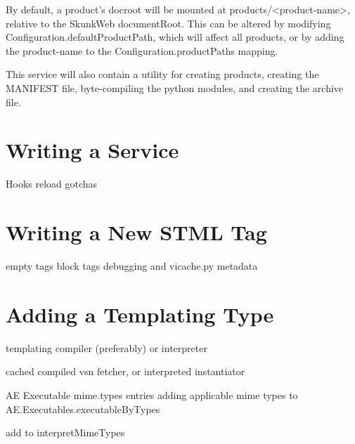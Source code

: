 \documentclass{manual}
\begin{document}
By default, a product's docroot will be mounted at
products/<product-name>, relative to the SkunkWeb documentRoot.  This
can be altered by modifying Configuration.defaultProductPath, which
will affect all products, or by adding the product-name to the
Configuration.productPaths mapping.

This service will also contain a utility for creating products, creating
the MANIFEST file, byte-compiling the python modules, and creating the
archive file.



\chapter{Writing a Service}
   Hooks
   reload gotchas

\chapter{Writing a New STML Tag}
   empty tags
   block tags
   debugging and vicache.py
   metadata

\chapter{Adding a Templating Type}
templating compiler (preferably) or interpreter

cached compiled vsn fetcher, or interpreted instantiator

AE Executable
mime.types entries
adding applicable mime types to AE.Executables.executableByTypes

add to interpretMimeTypes
\end{document}
